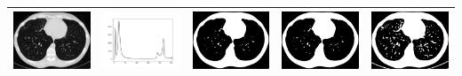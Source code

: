 \documentclass[11pt]{report}
\begin{document}
\begin{table}[htbp]
{\begin{tabular}{|c|c|c|c|c|}
        \includegraphics[width=5cm]{CT.png}        & \includegraphics[width=5cm]{CT_Hist.png}        & \includegraphics[width=5cm]{CT_Otsu.png}        & \includegraphics[width=5cm]{CT_Isodata.png}        & \includegraphics[width=5cm]{CT_Triangle.png}        \\
        \hline

\end{tabular}}
\end{table}
\end{document}
